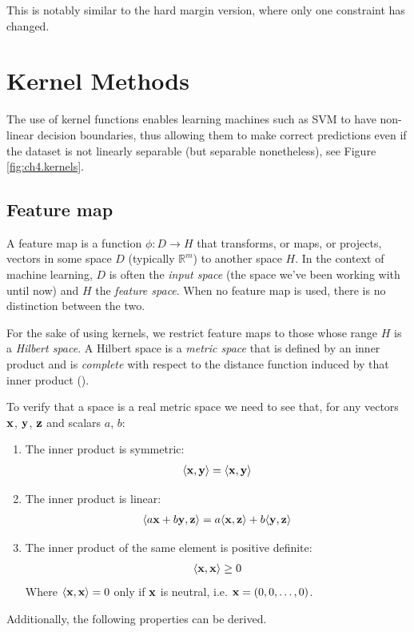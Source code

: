 This is notably similar to the hard margin version, where only one constraint has changed. 

\pagebreak

\section{Kernel Methods}
\label{sec:ch4.kernels}

The use of kernel functions enables learning machines such as SVM to have non-linear decision boundaries, thus allowing them to make correct predictions even if the dataset is not linearly separable (but separable nonetheless), see Figure \ref{fig:ch4.kernels}.

\subsection{Feature map}

A feature map is a function $\phi : D \rightarrow H$ that transforms, or maps, or projects, vectors in some space $D$ (typically $\mathbb{R}^m$) to another space $H$. In the context of machine learning, $D$ is often the \emph{input space} (the space we've been working with until now) and $H$ the \emph{feature space}. When no feature map is used, there is no distinction between the two.

For the sake of using kernels, we restrict feature maps to those whose range $H$ is a \emph{Hilbert space}. A Hilbert space is a \emph{metric space} that is defined by an inner product and is \emph{complete} with respect to the distance function induced by that inner product (\cite{noauthor_wikipedia_2021-1}).

To verify that a space is a real metric space we need to see that, for any vectors $\mathbf{x}$, $\mathbf{y}$, $\mathbf{z}$ and scalars $a$, $b$:

\begin{enumerate}
    \item The inner product is symmetric:
    \begin{align*}
        \langle\mathbf{x}, \mathbf{y}\rangle = \langle\mathbf{x}, \mathbf{y}\rangle
    \end{align*}
    \item The inner product is linear:
    \begin{align*}
        \langle a\mathbf{x} + b\mathbf{y}, \mathbf{z}\rangle = a\langle\mathbf{x}, \mathbf{z}\rangle + b\langle\mathbf{y}, \mathbf{z}\rangle 
    \end{align*}
    \item The inner product of the same element is positive definite:
    \begin{align*}
        \langle\mathbf{x}, \mathbf{x}\rangle \ge 0
    \end{align*}
    Where $\langle\mathbf{x}, \mathbf{x}\rangle = 0$ only if $\mathbf{x}$ is neutral, i.e. $\mathbf{x} = (0,0,\dots, 0)$. \\
\end{enumerate}
Additionally, the following properties can be derived.

